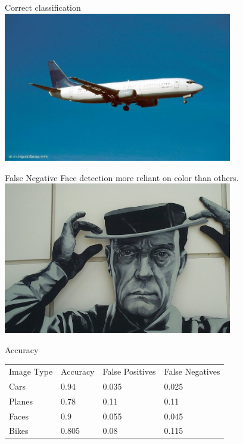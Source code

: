 \documentclass{beamer}
\begin{document}
\begin{frame}{Correct classification}
  \includegraphics[width=100mm]{images/plane_true_positive.png}
\end{frame}

\begin{frame}{False Negative}
  Face detection more reliant on color than others.
\includegraphics[width=100mm]{images/face_false_negative.png}
\end{frame}

\begin{frame}{Accuracy}
\begin{tabular}{| l | l | l | l |}
  \hline
  Image Type & Accuracy     & False Positives    & False Negatives \\
  Cars      & 0.94  & 0.035 & 0.025 \\
  Planes    & 0.78  & 0.11  & 0.11  \\
  Faces     & 0.9   & 0.055 & 0.045 \\
  Bikes     & 0.805 & 0.08  & 0.115 \\
  \hline
\end{tabular}
\end{frame}
\end{document}
